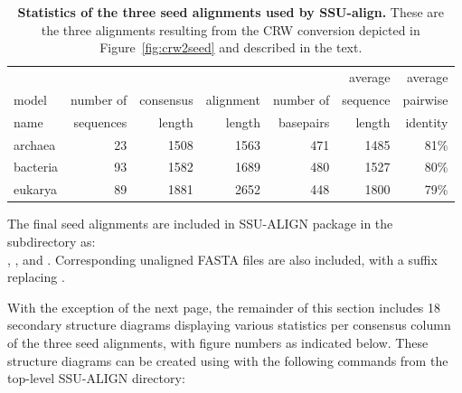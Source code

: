 \begin{table}[ht]
\begin{center}
\begin{tabular}{lrrrrrr} \hline
        &           &           &           &           & average   & average  \\
model   & number of & consensus & alignment & number of & sequence  & pairwise \\
name    & sequences & length    & length    & basepairs & length    & identity \\ \hline
archaea & 23        & 1508      & 1563      & 471       & 1485      & 81\%     \\
bacteria& 93        & 1582      & 1689      & 480       & 1527      & 80\%     \\
eukarya  & 89       & 1881      & 2652      & 448       & 1800      & 79\%     \\ 
\end{tabular}
\caption[Statistics of the three seed alignments used by SSU-align.]
{\textbf{Statistics of the three seed alignments used by
    SSU-align.} These are the three alignments resulting from the
    CRW conversion depicted in Figure~\ref{fig:crw2seed} and
    described in the text.}
\label{tbl:finalseeds}
\end{center}
\end{table}

\newpage 

The final seed alignments are included in SSU-ALIGN package in
the  subdirectory as: \\ ,
, and . Corresponding
unaligned FASTA files are also included, with a  suffix
replacing . 

With the exception of the next page, the remainder of this section
includes 18 secondary structure diagrams displaying various statistics
per consensus column of the three seed alignments, with figure numbers
as indicated below. These structure diagrams can be created using
 with the following commands from the top-level
SSU-ALIGN directory:


